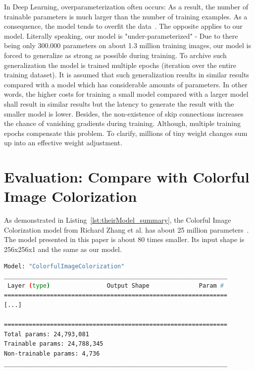 \documentclass[a4paper,12pt, listof=totoc,toc=sectionentrywithdots]{scrartcl}
\begin{document}
In Deep Learning, overparameterization often occurs:
As a result, the number of trainable parameters is much larger than the number of training examples.
As a consequence, the model tends to overfit the data~\cite{overparameterization}.
The opposite applies to our model.
Literally speaking, our model is "under-parameterized" -
Due to there being only 300.000 parameters on about 1.3 million training images, our model is forced to generalize as strong as possible during training.
To archive such generalization the model is trained multiple epochs (iteration over the entire training dataset).
It is assumed that such generalization results in similar results compared with a model which has considerable amounts of parameters.
In other words, the higher costs for training a small model compared with a larger model shall result in similar results but the latency to generate the result with the smaller model is lower.
Besides, the non-existence of skip connections increases the chance of vanishing gradients during training.
Although, multiple training epochs compensate this problem.
To clarify, millions of tiny weight changes sum up into an effective weight adjustment.


\section{Evaluation: Compare with Colorful Image Colorization}

As demonstrated in Listing~\ref{lst:theirModel_summary}, the Colorful Image Colorization model from Richard Zhang et al. has about 25 million parameters~\cite{colorize}.
The model presented in this paper is about 80 times smaller. 
Its input shape is 256x256x1 and the same as our model.

\begin{lstlisting}[language=bash, caption=Parameter amount of the Colorful Image Colorization model (output of \texttt{summary()} call)., label={lst:theirModel_summary}, basicstyle=\fontsize{11}{9}\selectfont\ttfamily]
Model: "ColorfulImageColorization"
_______________________________________________________________
 Layer (type)                Output Shape              Param #   
===============================================================
[...]   
                                                                 
===============================================================
Total params: 24,793,081
Trainable params: 24,788,345
Non-trainable params: 4,736
_______________________________________________________________
\end{lstlisting}
\end{document}
